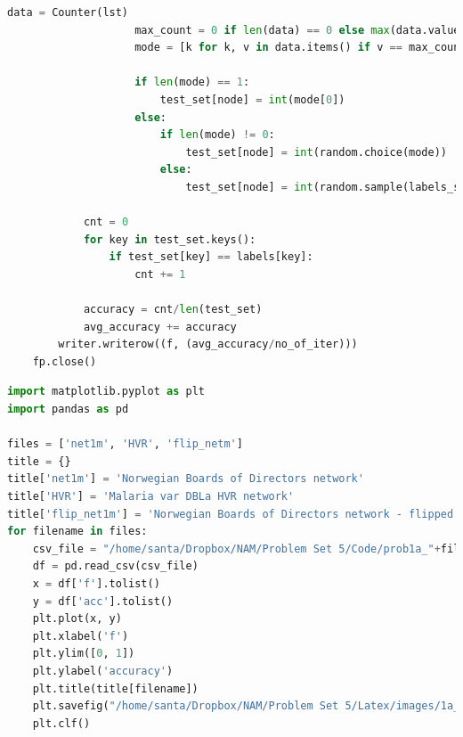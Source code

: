\documentclass{article}
\begin{document}
\begin{lstlisting}[language=Python, breaklines=true]
                    data = Counter(lst)
                    max_count = 0 if len(data) == 0 else max(data.values())
                    mode = [k for k, v in data.items() if v == max_count]
    
                    if len(mode) == 1:
                        test_set[node] = int(mode[0])
                    else:
                        if len(mode) != 0:
                            test_set[node] = int(random.choice(mode))
                        else:
                            test_set[node] = int(random.sample(labels_set, 1)[0])
    
            cnt = 0
            for key in test_set.keys():
                if test_set[key] == labels[key]:
                    cnt += 1
    
            accuracy = cnt/len(test_set)
            avg_accuracy += accuracy
        writer.writerow((f, (avg_accuracy/no_of_iter)))
    fp.close()

\end{lstlisting}

\begin{lstlisting}[language=Python, breaklines=true]
import matplotlib.pyplot as plt
import pandas as pd

files = ['net1m', 'HVR', 'flip_netm']
title = {}
title['net1m'] = 'Norwegian Boards of Directors network'
title['HVR'] = 'Malaria var DBLa HVR network'
title['flip_net1m'] = 'Norwegian Boards of Directors network - flipped'
for filename in files:
    csv_file = "/home/santa/Dropbox/NAM/Problem Set 5/Code/prob1a_"+filename+".csv"
    df = pd.read_csv(csv_file)
    x = df['f'].tolist()
    y = df['acc'].tolist()
    plt.plot(x, y)
    plt.xlabel('f')
    plt.ylim([0, 1])
    plt.ylabel('accuracy')
    plt.title(title[filename])
    plt.savefig("/home/santa/Dropbox/NAM/Problem Set 5/Latex/images/1a_"+filename+".png")
    plt.clf()
\end{lstlisting}
\end{document}
